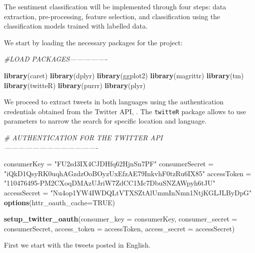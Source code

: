 \documentclass[]{article}
\newenvironment{Shaded}{\begin{snugshade}}{\end{snugshade}}
\newcommand{\KeywordTok}[1]{\textcolor[rgb]{0.13,0.29,0.53}{\textbf{{#1}}}}
\newcommand{\DataTypeTok}[1]{\textcolor[rgb]{0.13,0.29,0.53}{{#1}}}
\newcommand{\StringTok}[1]{\textcolor[rgb]{0.31,0.60,0.02}{{#1}}}
\newcommand{\CommentTok}[1]{\textcolor[rgb]{0.56,0.35,0.01}{\textit{{#1}}}}
\newcommand{\OtherTok}[1]{\textcolor[rgb]{0.56,0.35,0.01}{{#1}}}
\newcommand{\NormalTok}[1]{{#1}}
\begin{document}
The sentiment classification will be implemented through four steps:
data extraction, pre-processing, feature selection, and classification
using the classification models trained with labelled data.

We start by loading the necessary packages for the project:

\begin{Shaded}
\begin{Highlighting}[]
\CommentTok{#LOAD PACKAGES----------------}

\KeywordTok{library}\NormalTok{(caret)}
\KeywordTok{library}\NormalTok{(dplyr)}
\KeywordTok{library}\NormalTok{(ggplot2)}
\KeywordTok{library}\NormalTok{(magrittr)}
\KeywordTok{library}\NormalTok{(tm)}
\KeywordTok{library}\NormalTok{(twitteR)}
\KeywordTok{library}\NormalTok{(purrr)}
\KeywordTok{library}\NormalTok{(plyr)}
\end{Highlighting}
\end{Shaded}

We proceed to extract tweets in both languages using the authentication
credentials obtained from the Twitter API, . The \texttt{twitteR}
package allows to use parameters to narrow the search for specific
location and language.

\begin{Shaded}
\begin{Highlighting}[]
\CommentTok{# AUTHENTICATION FOR THE TWITTER API----------------------------------------}

\NormalTok{consumerKey =}\StringTok{ "FU2sd3IX4CJDHfq62HjnSn7PF"}  
\NormalTok{consumerSecret =}\StringTok{ "iQkD1QsyRK0uqhAGzdzOoBOyzUxEfzAE79InkvhF0tzRu6IX85"}
\NormalTok{accessToken =}\StringTok{ "110476495-PM2CXoqDMAzUJriW7ZdCC1Mc7DbuSNZAWpyh6tJU"}
\NormalTok{accessSecret =}\StringTok{ "Nu4op1YW4IWDQLtVTXSZtAlUmmInNmn1NtjKGLJLByDpG"}
\KeywordTok{options}\NormalTok{(}\DataTypeTok{httr_oauth_cache=}\OtherTok{TRUE}\NormalTok{)}

\KeywordTok{setup_twitter_oauth}\NormalTok{(}\DataTypeTok{consumer_key =} \NormalTok{consumerKey, }\DataTypeTok{consumer_secret =} \NormalTok{consumerSecret,}
                    \DataTypeTok{access_token =} \NormalTok{accessToken, }\DataTypeTok{access_secret =} \NormalTok{accessSecret)}
\end{Highlighting}
\end{Shaded}

First we start with the tweets posted in English.
\end{document}
